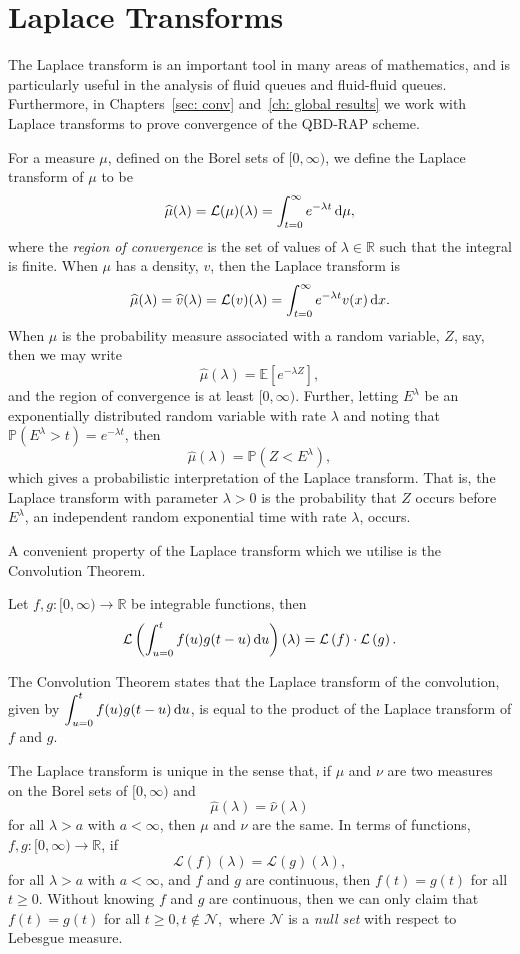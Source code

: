 \section{Laplace Transforms}
The Laplace transform is an important tool in many areas of mathematics, and is particularly useful in the analysis of fluid queues and fluid-fluid queues. Furthermore, in Chapters~\ref{sec: conv} and~\ref{ch: global results} we work with {Laplace transforms} to prove convergence of the QBD-RAP scheme. 

For a measure \( \mu\), defined on the Borel sets of \([0,\infty)\), we define the Laplace transform of \(\mu\) to be
\[\widehat \mu(\lambda) = \mathcal L(\mu)(\lambda) = \int_{t=0}^\infty e^{-\lambda t}\, \mathrm{d} \mu,\]
where the \emph{region of convergence} is the set of values of \(\lambda\in\mathbb R\) such that the integral is finite. When \(\mu\) has a density, \(v\), then the Laplace transform is 
\[\widehat \mu(\lambda) = \widehat v(\lambda) = \mathcal L(v)(\lambda) = \int_{t=0}^\infty e^{-\lambda t}v(x)\, \mathrm{d} x.\]
When \(\mu\) is the probability measure associated with a random variable, \(Z\), say, then we may write 
\[\widehat \mu(\lambda)=\mathbb E[e^{-\lambda Z}],\]
and the region of convergence is at least \([0,\infty)\). 
Further, letting \(E^\lambda\) be an exponentially distributed random variable with rate \(\lambda\) and noting that \(\mathbb P(E^\lambda >t ) = e^{-\lambda t}\), then 
\[\widehat \mu(\lambda)=\mathbb P(Z<E^\lambda),\]
which gives a probabilistic interpretation of the Laplace transform. That is, the Laplace transform with parameter \(\lambda >0\) is the probability that \(Z\) occurs before \(E^\lambda\), an independent random exponential time with rate \(\lambda\), occurs. 

A convenient property of the Laplace transform which we utilise is the Convolution Theorem. 
\begin{thm}
	Let \(f,g: [0,\infty) \to \mathbb R\) be integrable functions, then 
	\[\mathcal L\left(\int_{u=0}^tf(u)g(t-u)\, \mathrm{d} u\right)(\lambda) = \mathcal L\left(f\right)\cdot \mathcal L\left(g\right).\]
\end{thm}
The Convolution Theorem states that the Laplace transform of the convolution, given by \(\displaystyle \int_{u=0}^tf(u)g(t-u)\, \mathrm{d} u\), is equal to the product of the Laplace transform of \(f\) and \(g\). 

The Laplace transform is unique in the sense that, if \(\mu\) and \(\nu\) are two measures on the Borel sets of \([0,\infty)\) and 
\[\widehat \mu(\lambda) = \widehat \nu(\lambda)\] 
for all \(\lambda > a\) with \(a<\infty\), then \(\mu\) and \(\nu\) are the same. In terms of functions, \(f,g: [0,\infty) \to \mathbb R\), if 
\[\mathcal L(f)(\lambda) = \mathcal L(g)(\lambda),\]
for all \(\lambda > a\) with \(a<\infty\), and \(f\) and \(g\) are continuous, then \(f(t)=g(t)\) for all \(t\geq 0\). Without knowing \(f\) and \(g\) are continuous, then we can only claim that 
\(f(t)=g(t)\) for all \(t\geq 0, t\notin \mathcal N,\) where \(\mathcal N\) is a \emph{null set} with respect to Lebesgue measure. 

